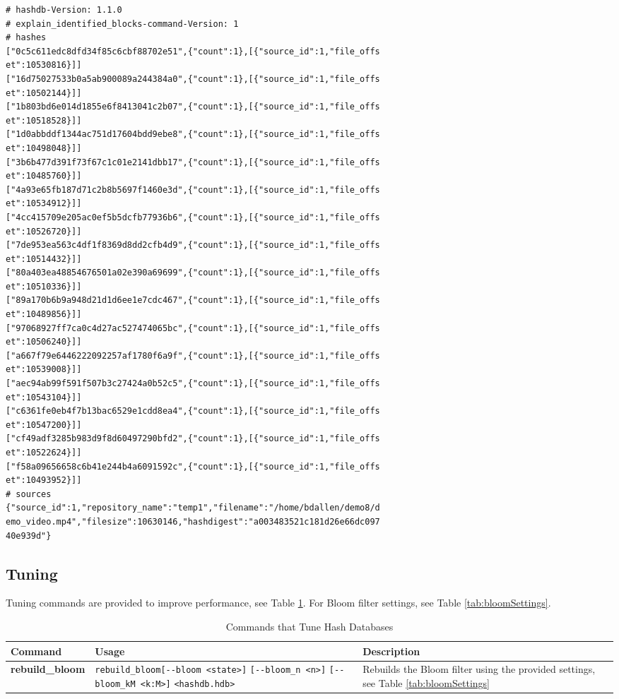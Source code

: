 \documentclass[11pt,fleqn]{article} %
\begin{document}
\begin{lstlisting}[float, caption={The \texttt{identified\_hashes\_and\_sources.txt} file produced by post-processing the \texttt{identified\_blocks.txt} file using the \texttt{explain\_identified\_blocks} command}, label=explainHashesAndSources]
# hashdb-Version: 1.1.0
# explain_identified_blocks-command-Version: 1
# hashes
["0c5c611edc8dfd34f85c6cbf88702e51",{"count":1},[{"source_id":1,"file_offs
et":10530816}]]
["16d75027533b0a5ab900089a244384a0",{"count":1},[{"source_id":1,"file_offs
et":10502144}]]
["1b803bd6e014d1855e6f8413041c2b07",{"count":1},[{"source_id":1,"file_offs
et":10518528}]]
["1d0abbddf1344ac751d17604bdd9ebe8",{"count":1},[{"source_id":1,"file_offs
et":10498048}]]
["3b6b477d391f73f67c1c01e2141dbb17",{"count":1},[{"source_id":1,"file_offs
et":10485760}]]
["4a93e65fb187d71c2b8b5697f1460e3d",{"count":1},[{"source_id":1,"file_offs
et":10534912}]]
["4cc415709e205ac0ef5b5dcfb77936b6",{"count":1},[{"source_id":1,"file_offs
et":10526720}]]
["7de953ea563c4df1f8369d8dd2cfb4d9",{"count":1},[{"source_id":1,"file_offs
et":10514432}]]
["80a403ea48854676501a02e390a69699",{"count":1},[{"source_id":1,"file_offs
et":10510336}]]
["89a170b6b9a948d21d1d6ee1e7cdc467",{"count":1},[{"source_id":1,"file_offs
et":10489856}]]
["97068927ff7ca0c4d27ac527474065bc",{"count":1},[{"source_id":1,"file_offs
et":10506240}]]
["a667f79e6446222092257af1780f6a9f",{"count":1},[{"source_id":1,"file_offs
et":10539008}]]
["aec94ab99f591f507b3c27424a0b52c5",{"count":1},[{"source_id":1,"file_offs
et":10543104}]]
["c6361fe0eb4f7b13bac6529e1cdd8ea4",{"count":1},[{"source_id":1,"file_offs
et":10547200}]]
["cf49adf3285b983d9f8d60497290bfd2",{"count":1},[{"source_id":1,"file_offs
et":10522624}]]
["f58a09656658c6b41e244b4a6091592c",{"count":1},[{"source_id":1,"file_offs
et":10493952}]]
# sources
{"source_id":1,"repository_name":"temp1","filename":"/home/bdallen/demo8/d
emo_video.mp4","filesize":10630146,"hashdigest":"a003483521c181d26e66dc097
40e939d"}
\end{lstlisting}

\subsection{Tuning}
Tuning commands are provided to improve performance,
see Table \ref{tab:tuning}.
For Bloom filter settings, see Table \ref{tab:bloomSettings}.

\begin{table}[!ht]
\centering
\caption{Commands that Tune Hash Databases}
\label{tab:tuning}
\begin{tabular}{|p{3.5 cm}|p{6 cm}|p{4 cm}|}
\hline \hline
\textbf{Command} & \textbf{Usage} & \textbf{Description} \\
\hline
\textbf{rebuild\_bloom} & \verb+rebuild_bloom[--bloom <state>]+ \verb+[--bloom_n <n>]+ \verb+[--bloom_kM <k:M>]+ \verb+<hashdb.hdb>+ & Rebuilds the Bloom filter using the provided settings, see Table \ref{tab:bloomSettings}\\
\hline
\end{tabular}
\end{table}
\end{document}
